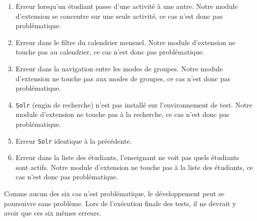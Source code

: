 \begin{enumerate}
  \item Erreur lorsqu'un étudiant passe d'une activité à une autre.
        Notre module d'extension se concentre sur une seule activité, ce cas n'est donc pas problématique.
        
  \item Erreur dans le filtre du calendrier mensuel.
        Notre module d'extension ne touche pas au calendrier, ce cas n'est donc pas problématique.
        
  \item Erreur dans la navigation entre les modes de groupes.
        Notre module d'extension ne touche pas aux modes de groupes, ce cas n'est donc pas problématique.
        
  \item \texttt{Solr} (engin de recherche) n'est pas installé sur l'environnement de test.
        Notre module d'extension ne touche pas à la recherche, ce cas n'est donc pas problématique.
        
  \item Erreur \texttt{Solr} identique à la précédente.
  
  \item Erreur dans la liste des étudiants, l'enseignant ne voit pas quels étudiants sont actifs.
        Notre module d'extension ne touche pas à la liste des étudiants, ce cas n'est donc pas problématique.
\end{enumerate}

Comme aucun des six cas n'est problématique, le développement peut se poursuivre sans problème.
Lors de l'exécution finale des tests, il ne devrait y avoir que ces six mêmes erreurs.
